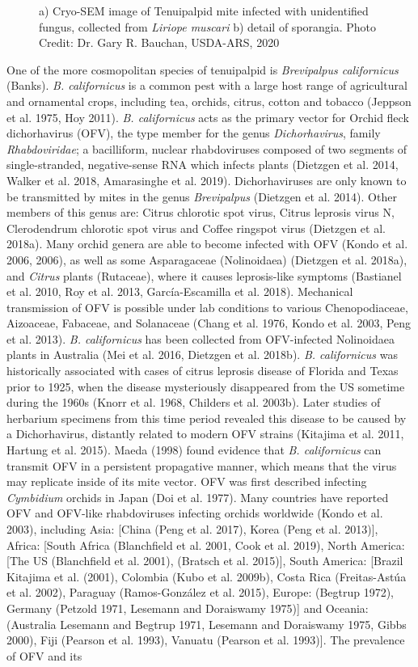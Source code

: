 \documentclass[12pt,final,CPage]{ufthesis}
\begin{document}
{\begin{figure}
  \caption{a) Cryo-SEM image of Tenuipalpid mite infected with unidentified fungus, collected from \textit{Liriope muscari} b) detail of sporangia. Photo Credit: Dr. Gary R. Bauchan, USDA-ARS, 2020}\label{fig:brevi-fungus}
  \end{figure}
  One of the more cosmopolitan species of tenuipalpid is \emph{Brevipalpus californicus} (Banks). \emph{B. californicus} is a common pest with a large host range of agricultural and ornamental crops, including tea, orchids, citrus, cotton and tobacco (Jeppson et al. 1975, Hoy 2011). \emph{B. californicus} acts as the primary vector for Orchid fleck dichorhavirus (OFV), the type member for the genus \emph{Dichorhavirus}, family \emph{Rhabdoviridae}; a bacilliform, nuclear rhabdoviruses composed of two segments of single-stranded, negative-sense RNA which infects plants (Dietzgen et al. 2014, Walker et al. 2018, Amarasinghe et al. 2019). Dichorhaviruses are only known to be transmitted by mites in the genus \emph{Brevipalpus} (Dietzgen et al. 2014). Other members of this genus are: Citrus chlorotic spot virus, Citrus leprosis virus N, Clerodendrum chlorotic spot virus and Coffee ringspot virus (Dietzgen et al. 2018a). Many orchid genera are able to become infected with OFV (Kondo et al. 2006, 2006), as well as some Asparagaceae (Nolinoidaea) (Dietzgen et al. 2018a), and \emph{Citrus} plants (Rutaceae), where it causes leprosis-like symptoms (Bastianel et al. 2010, Roy et al. 2013, García-Escamilla et al. 2018). Mechanical transmission of OFV is possible under lab conditions to various Chenopodiaceae, Aizoaceae, Fabaceae, and Solanaceae (Chang et al. 1976, Kondo et al. 2003, Peng et al. 2013). \emph{B. californicus} has been collected from OFV-infected Nolinoidaea plants in Australia (Mei et al. 2016, Dietzgen et al. 2018b). \emph{B. californicus} was historically associated with cases of citrus leprosis disease of Florida and Texas prior to 1925, when the disease mysteriously disappeared from the US sometime during the 1960s (Knorr et al. 1968, Childers et al. 2003b). Later studies of herbarium specimens from this time period revealed this disease to be caused by a Dichorhavirus, distantly related to modern OFV strains (Kitajima et al. 2011, Hartung et al. 2015). Maeda (1998) found evidence that \emph{B. californicus} can transmit OFV in a persistent propagative manner, which means that the virus may replicate inside of its mite vector. OFV was first described infecting \emph{Cymbidium} orchids in Japan (Doi et al. 1977). Many countries have reported OFV and OFV-like rhabdoviruses infecting orchids worldwide (Kondo et al. 2003), including Asia: {[}China (Peng et al. 2017), Korea (Peng et al. 2013){]}, Africa: {[}South Africa (Blanchfield et al. 2001, Cook et al. 2019), North America: {[}The US (Blanchfield et al. 2001), (Bratsch et al. 2015){]}, South America: {[}Brazil Kitajima et al. (2001), Colombia (Kubo et al. 2009b), Costa Rica (Freitas-Astúa et al. 2002), Paraguay (Ramos-González et al. 2015), Europe: (Begtrup 1972), Germany (Petzold 1971, Lesemann and Doraiswamy 1975){]} and Oceania: (Australia Lesemann and Begtrup 1971, Lesemann and Doraiswamy 1975, Gibbs 2000), Fiji (Pearson et al. 1993), Vanuatu (Pearson et al. 1993){]}. The prevalence of OFV and its }
\end{document}
